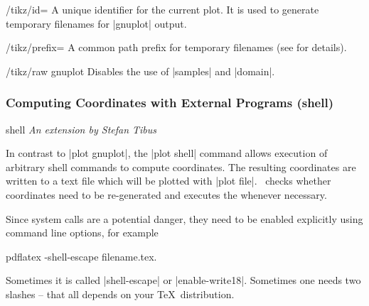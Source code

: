 {\begin{key}{/tikz/id=}
	 A unique identifier for the current plot. It is used to generate temporary filenames for |gnuplot| output.
\end{key}

\begin{key}{/tikz/prefix=}
	 A common path prefix for temporary filenames (see \cite[section~18.6]{tikz} for details).
\end{key}

\begin{key}{/tikz/raw gnuplot}
	 Disables the use of |samples| and |domain|.
\end{key}

\subsubsection{Computing Coordinates with External Programs (shell)}

\begin{addplotoperation}[]{shell}{}
{\small \emph{An extension by Stefan Tibus}}

In contrast to |plot gnuplot|, the |plot shell| command allows execution of arbitrary shell commands to compute coordinates. The resulting coordinates are written to a text file which will be plotted with |plot file|. \PGF\ checks whether coordinates need to be re-generated and executes the  whenever necessary.

Since system calls are a potential danger, they need to be enabled explicitly using command line options, for example
\begin{codeexample}
pdflatex -shell-escape filename.tex.
\end{codeexample}
Sometimes it is called |shell-escape| or |enable-write18|. Sometimes one needs two slashes -- that all depends on your \TeX\ distribution.
\begin{codeexample}[]
\end{codeexample}

\begin{codeexample}[]
\end{codeexample}


\end{addplotoperation}}
